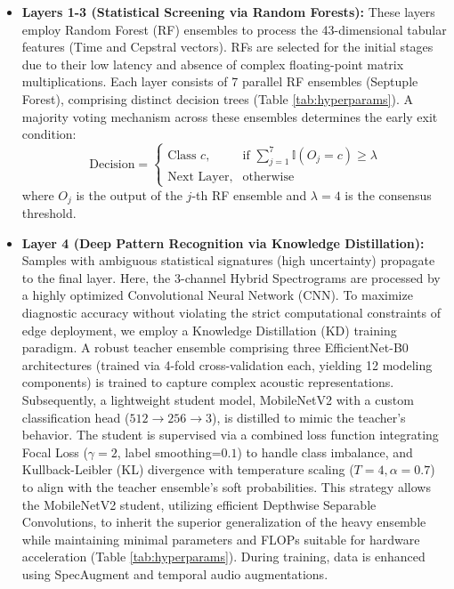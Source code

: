 \begin{itemize}
    \item \textbf{Layers 1-3 (Statistical Screening via Random Forests):} These layers employ Random Forest (RF) ensembles to process the 43-dimensional tabular features (Time and Cepstral vectors). RFs are selected for the initial stages due to their low latency and absence of complex floating-point matrix multiplications. Each layer consists of 7 parallel RF ensembles (Septuple Forest), comprising distinct decision trees (Table \ref{tab:hyperparams}). A majority voting mechanism across these ensembles determines the early exit condition:
    \begin{equation}
    \text{Decision} = 
    \begin{cases} 
      \text{Class } c, & \text{if } \sum_{j=1}^{7} \mathbb{I}(O_j = c) \ge \lambda \\
      \text{Next Layer}, & \text{otherwise}
    \end{cases}
    \end{equation}
    where $O_j$ is the output of the $j$-th RF ensemble and $\lambda=4$ is the consensus threshold.
    
    \item \textbf{Layer 4 (Deep Pattern Recognition via Knowledge Distillation):} Samples with ambiguous statistical signatures (high uncertainty) propagate to the final layer. Here, the 3-channel Hybrid Spectrograms are processed by a highly optimized Convolutional Neural Network (CNN). To maximize diagnostic accuracy without violating the strict computational constraints of edge deployment, we employ a Knowledge Distillation (KD) training paradigm. A robust teacher ensemble comprising three EfficientNet-B0 architectures (trained via 4-fold cross-validation each, yielding 12 modeling components) is trained to capture complex acoustic representations. Subsequently, a lightweight student model, MobileNetV2 \cite{b35} with a custom classification head ($512 \rightarrow 256 \rightarrow 3$), is distilled to mimic the teacher's behavior. The student is supervised via a combined loss function integrating Focal Loss ($\gamma=2$, label smoothing=$0.1$) to handle class imbalance, and Kullback-Leibler (KL) divergence with temperature scaling ($T=4, \alpha=0.7$) to align with the teacher ensemble's soft probabilities. This strategy allows the MobileNetV2 student, utilizing efficient Depthwise Separable Convolutions, to inherit the superior generalization of the heavy ensemble while maintaining minimal parameters and FLOPs suitable for hardware acceleration (Table \ref{tab:hyperparams}). During training, data is enhanced using SpecAugment and temporal audio augmentations.
\end{itemize}

